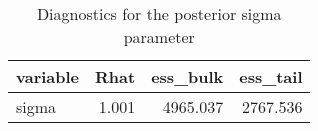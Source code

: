 \begin{table}[!h]

\caption{\label{tab:diagnostics-sigma-aggregated}Diagnostics for the posterior sigma parameter}
\centering
\begin{tabular}[t]{lrrr}
\toprule
variable & Rhat & ess\_bulk & ess\_tail\\
\midrule
sigma & 1.001 & 4965.037 & 2767.536\\
\bottomrule
\end{tabular}
\end{table}
